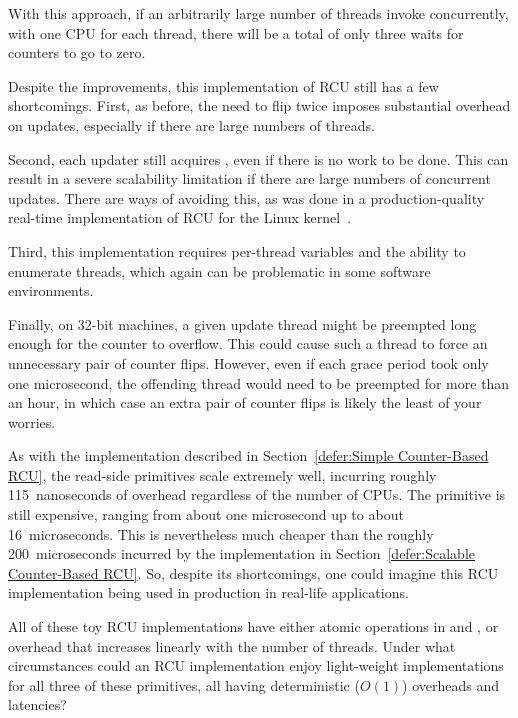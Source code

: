 With this approach, if an arbitrarily large number of threads invoke
 concurrently, with one CPU for each thread, there
will be a total of only three waits for counters to go to zero.

Despite the improvements, this implementation of RCU still
has a few shortcomings.
First, as before, the need to flip  twice imposes substantial
overhead on updates, especially if there are large
numbers of threads.

Second, each updater still acquires , even if there
is no work to be done.
This can result in a severe scalability limitation
if there are large numbers of concurrent updates.
There are ways of avoiding this, as was done in a
production-quality real-time implementation of RCU for the Linux
kernel~\cite{PaulEMcKenney2007PreemptibleRCU}.

Third, this implementation requires per-thread variables
and the ability to enumerate threads, which again can be
problematic in some software environments.

Finally, on 32-bit machines, a given update thread might be
preempted long enough for the 
counter to overflow.
This could cause such a thread to force an unnecessary
pair of counter flips.
However, even if each grace period took only one
microsecond, the offending thread would need to be
preempted for more than an hour, in which case an
extra pair of counter flips is likely the least of
your worries.

As with the implementation described in
Section~\ref{defer:Simple Counter-Based RCU},
the read-side primitives scale extremely well, incurring roughly
115~nanoseconds of overhead regardless of the number of CPUs.
The  primitive is still expensive,
ranging from about one microsecond up to about 16~microseconds.
This is nevertheless much cheaper than the roughly 200~microseconds
incurred by the implementation in
Section~\ref{defer:Scalable Counter-Based RCU}.
So, despite its shortcomings, one could imagine this
RCU implementation being used in production in real-life applications.

\QuickQuiz{}
	All of these toy RCU implementations have either atomic operations
	in  and ,
	or 
	overhead that increases linearly with the number of threads.
	Under what circumstances could an RCU implementation enjoy
	light-weight implementations for all three of these primitives,
	all having deterministic ($O\left(1\right)$) overheads and latencies?
 \QuickQuizEnd

